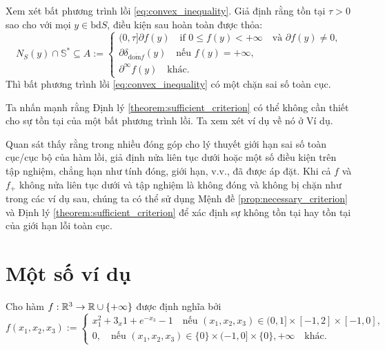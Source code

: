 \begin{theorem}
    \label{theorem:sufficient_criterion}
    Xem xét bất phương trình lồi \eqref{eq:convex_inequality}. Giả định rằng tồn tại $\tau > 0$ sao cho với mọi $y \in \text{bd}S$, điều kiện sau hoàn toàn được thỏa:
    \begin{equation}
        \label{eq:sufficient_condition}
        N_S(y) \cap \mathbb{S}^* \subseteq A := \begin{cases}
            (0, \tau]\partial f(y) \quad\text{if } 0 \leq f(y) < + \infty \quad\text{và } \partial f(y) \ne 0,\\
            \partial\delta_{\overline{\text{dom}f}}(y) \quad\text{nếu } f(y) = +\infty,\\
            \partial^{\infty}f(y)\quad\text{khác}.
        \end{cases}
    \end{equation}
    Thì bất phương trình lồi \eqref{eq:convex_inequality} có một chặn sai số toàn cục.
\end{theorem}

\begin{remark}
    Ta nhấn mạnh rằng Định lý \ref{theorem:sufficient_criterion} có thể không cần thiết cho sự tồn tại của một bất phương trình lồi. Ta xem xét ví dụ về nó ở Ví dụ.
\end{remark}

\begin{remark}
    Quan sát thấy rằng trong nhiều đóng góp cho lý thuyết giới hạn sai số toàn cục/cục bộ của hàm lồi, giả định nửa liên tục dưới hoặc một số điều kiện trên tập nghiệm, chẳng hạn như tính đóng, giới hạn, v.v., đã được áp đặt. Khi cả $f$ và $f_{+}$ không nửa liên tục dưới và tập nghiệm là không đóng và không bị chặn như trong các ví dụ sau, chúng ta có thể sử dụng Mệnh đề \ref{prop:necessary_criterion} và Định lý \ref{theorem:sufficient_criterion} để xác định sự không tồn tại hay tồn tại của giới hạn lỗi toàn cục.
\end{remark}

\section{Một số ví dụ}

\begin{eg}
    Cho hàm $f: \mathbb{R}^3 \rightarrow \mathbb{R} \cup \{+\infty\}$ được định nghĩa bởi
    \begin{equation}
        f(x_1, x_2, x_3) := \begin{cases}
            x_1^2 + 3_x1 + e^{-x_3} - 1 \quad\text{nếu } (x_1,x_2,x_3) \in (0, 1] \times [-1, 2] \times [-1, 0], \\
            0, \quad\text{nếu } (x_1,x_2,x_3) \in \{0\} \times (-1, 0] \times \{0\},
            +\infty\quad\text{khác}.
        \end{cases}
    \end{equation}
\end{eg}

